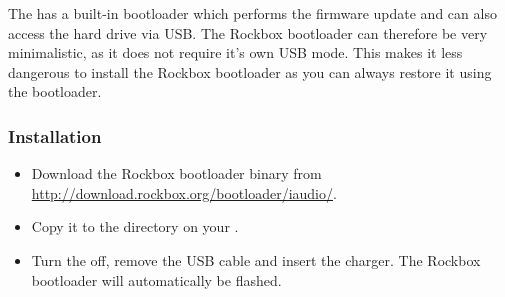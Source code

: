 The \playername{} has a built-in bootloader which performs the
firmware update and can also access the hard drive via USB.  The
Rockbox bootloader can therefore be very minimalistic, as it does not require
 it's own USB mode.  This makes it less dangerous to install the Rockbox bootloader
 as you can always restore it using the \playerman{} bootloader.


\subsubsection{Installation}
\begin{itemize}
\item Download the Rockbox bootloader binary from 
\url{http://download.rockbox.org/bootloader/iaudio/}.
\item Copy it to the  directory on your \dap{}.
\item Turn the \dap{} off, remove the USB cable and insert the charger. The
Rockbox bootloader will automatically be flashed.
\end{itemize}

